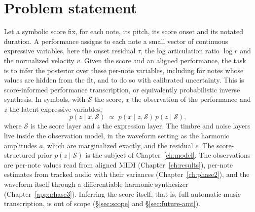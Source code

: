\documentclass[11pt,a4paper]{report}
\newcommand{\score}{\mathcal{S}}
\begin{document}
\section{Problem statement}
Let a symbolic score fix, for each note, its pitch, its score onset and its
notated duration. A performance assigns to each note a small vector of
continuous expressive variables, here the onset residual $\tau$, the log
articulation ratio $\log r$ and the normalized velocity $v$. Given the score
and an aligned performance, the task is to infer the posterior over these
per-note variables, including for notes whose values are hidden from the
fit, and to do so with calibrated uncertainty. This is score-informed
performance transcription, or equivalently probabilistic inverse synthesis.
In symbols, with $\score$ the score, $x$ the observation of the performance
and $z$ the latent expressive variables,
\begin{equation*}
  p(z \mid x, \score) \;\propto\; p(x \mid z, \score)\, p(z \mid \score),
\end{equation*}
where $\score$ is the score layer and $z$ the expression layer. The timbre
and noise layers live inside the observation model, in the waveform setting
as the harmonic amplitudes $a$, which are marginalized exactly, and the
residual $\epsilon$. The score-structured prior $p(z \mid \score)$ is the
subject of Chapter~\ref{ch:model}. The observations are per-note values
read from aligned MIDI (Chapter~\ref{ch:results}), per-note estimates from
tracked audio with their variances (Chapter~\ref{ch:phase2}), and the
waveform itself through a differentiable harmonic synthesizer
(Chapter~\ref{app:phase3}). Inferring
the score itself, that is, full automatic music transcription, is out of
scope (\S\ref{sec:scope} and \S\ref{sec:future-amt}).
\end{document}
